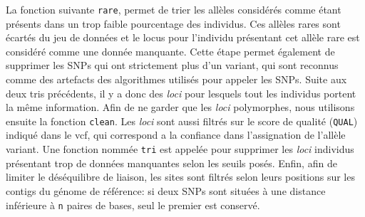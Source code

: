 La fonction suivante \verb|rare|, permet de trier les allèles considérés comme étant présents dans un trop faible pourcentage des individus. Ces allèles rares sont écartés du jeu de données et le locus pour l'individu présentant cet allèle rare est considéré comme une donnée manquante.
  Cette étape permet également de supprimer les SNPs qui ont strictement plus d'un variant, qui sont reconnus comme des artefacts des algorithmes utilisés pour appeler les SNPs.
 Suite aux deux tris précédents, il y a donc des \textit{loci} pour lesquels tout les individus portent la même information. Afin de ne garder que les \textit{loci} polymorphes, nous utilisons ensuite la fonction \verb|clean|. Les \textit{loci} sont aussi filtrés sur le score de qualité (\verb|QUAL|) indiqué dans le vcf, qui correspond a la confiance dans l'assignation de l'allèle variant.
 Une fonction nommée \verb|tri| est appelée pour supprimer les \textit{loci} \DIFdelbegin {}\DIFdelend \DIFaddbegin {}\DIFaddend individus présentant trop de données manquantes selon les seuils posés.
 Enfin, afin de limiter le déséquilibre de liaison, les sites sont filtrés selon leurs positions sur les contigs du génome de référence: si deux SNPs sont situées à une distance inférieure à \verb|n| paires de bases, seul le premier est conservé.

